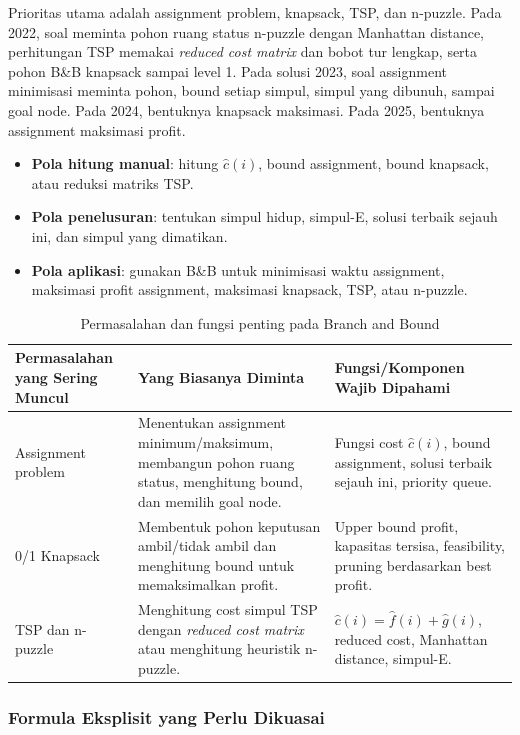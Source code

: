 Prioritas utama adalah assignment problem, knapsack, TSP, dan n-puzzle. Pada 2022, soal meminta pohon ruang status n-puzzle dengan Manhattan distance, perhitungan TSP memakai \textit{reduced cost matrix} dan bobot tur lengkap, serta pohon B\&B knapsack sampai level 1. Pada solusi 2023, soal assignment minimisasi meminta pohon, bound setiap simpul, simpul yang dibunuh, sampai goal node. Pada 2024, bentuknya knapsack maksimasi. Pada 2025, bentuknya assignment maksimasi profit.

\begin{itemize}
    \item \textbf{Pola hitung manual}: hitung $\hat{c}(i)$, bound assignment, bound knapsack, atau reduksi matriks TSP.
    \item \textbf{Pola penelusuran}: tentukan simpul hidup, simpul-E, solusi terbaik sejauh ini, dan simpul yang dimatikan.
    \item \textbf{Pola aplikasi}: gunakan B\&B untuk minimisasi waktu assignment, maksimasi profit assignment, maksimasi knapsack, TSP, atau n-puzzle.
\end{itemize}

\begin{table}[H]
\centering
\begin{tabularx}{\textwidth}{|L{0.30\textwidth}|X|L{0.28\textwidth}|}
\hline
\textbf{Permasalahan yang Sering Muncul} & \textbf{Yang Biasanya Diminta} & \textbf{Fungsi/Komponen Wajib Dipahami} \\
\hline
Assignment problem & Menentukan assignment minimum/maksimum, membangun pohon ruang status, menghitung bound, dan memilih goal node. & Fungsi cost $\hat{c}(i)$, bound assignment, solusi terbaik sejauh ini, priority queue. \\
/1 Knapsack & Membentuk pohon keputusan ambil/tidak ambil dan menghitung bound untuk memaksimalkan profit. & Upper bound profit, kapasitas tersisa, feasibility, pruning berdasarkan best profit. \\
\hline
TSP dan n-puzzle & Menghitung cost simpul TSP dengan \textit{reduced cost matrix} atau menghitung heuristik n-puzzle. & $\hat{c}(i)=\hat{f}(i)+\hat{g}(i)$, reduced cost, Manhattan distance, simpul-E. \\
\hline
\end{tabularx}
\caption{Permasalahan dan fungsi penting pada Branch and Bound}
\label{tab:pola-fungsi-branch-and-bound}
\end{table}

\subsubsection{Formula Eksplisit yang Perlu Dikuasai}

